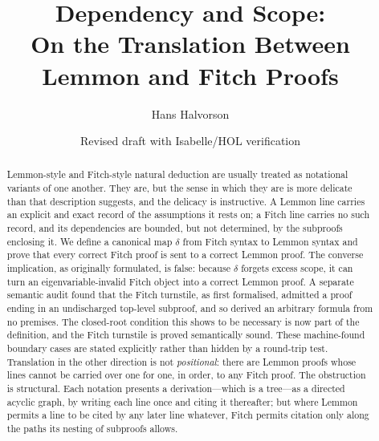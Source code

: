 \documentclass[11pt]{article}
\title{Dependency and Scope:\\
       On the Translation Between Lemmon and Fitch Proofs}
\author{Hans Halvorson}
\date{Revised draft with Isabelle/HOL verification}
\theoremstyle{plain}
\theoremstyle{definition}
\theoremstyle{remark}
\begin{document}
\maketitle

\begin{abstract}
Lemmon-style and Fitch-style natural deduction are usually treated as
notational variants of one another. They are, but the sense in which they are
is more delicate than that description suggests, and the delicacy is
instructive. A Lemmon line carries an explicit and exact record of the
assumptions it rests on; a Fitch line carries no such record, and its
dependencies are bounded, but not determined, by the subproofs enclosing it.
We define a canonical map $\delta$ from Fitch syntax to Lemmon syntax and
prove that every correct Fitch proof is sent to a correct Lemmon proof.
The converse implication, as originally formulated, is false: because
$\delta$ forgets excess scope, it can turn an eigenvariable-invalid Fitch
object into a correct Lemmon proof. A separate semantic audit found that the
Fitch turnstile, as first formalised, admitted a proof ending in an
undischarged top-level subproof, and so derived an arbitrary formula from no
premises. The closed-root condition this shows to be necessary is now part of
the definition, and the Fitch turnstile is proved semantically sound. These
machine-found boundary cases are stated explicitly rather than hidden by a
round-trip test. Translation in the other direction is not
\emph{positional}: there are Lemmon proofs whose lines cannot be carried over
one for one, in order, to any Fitch proof. The obstruction is structural.
Each notation presents a derivation---which is a tree---as a directed acyclic
graph, by writing each line once and citing it thereafter; but where Lemmon
permits a line to be cited by any later line whatever, Fitch permits citation
only along the paths its nesting of subproofs allows.


\end{abstract}
\end{document}
